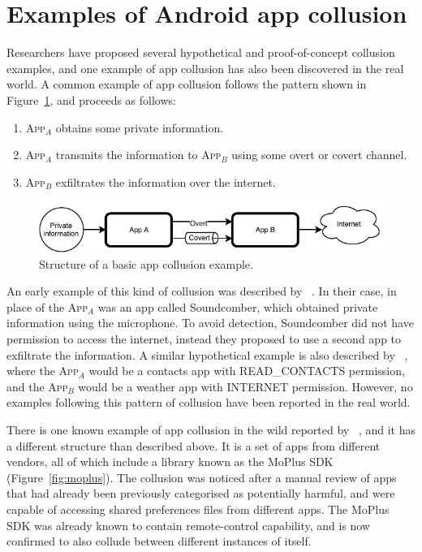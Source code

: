 \documentclass[article, oneside]{aaltoseries}
\newcommand{\Fref}[1]{Figure~\ref{#1}}
\newcommand{\app}[1]{A\textsc{pp}$_{#1}$\xspace}
\begin{document}
\section{Examples of Android app collusion}
\label{sec:examples}

Researchers have proposed several hypothetical and proof-of-concept collusion examples, and one example of app collusion has also been discovered in the real world. A common example of app collusion follows the pattern shown in \Fref{fig:sample}, and proceeds as follows:
\begin{enumerate}[nosep]
	\item \app{A} obtains some private information.
	\item \app{A} transmits the information to \app{B} using some overt or covert channel.
	\item \app{B} exfiltrates the information over the internet.
\end{enumerate}

\begin{figure}[h]
	\centering
	\includegraphics[width=1.0\textwidth]{figures/Collusion1}
	\caption{Structure of a basic app collusion example.}
	\label{fig:sample}
\end{figure}

An early example of this kind of collusion was described by \citeauthor{Schlegel2011}~\cite{Schlegel2011}. In their case, in place of the \app{A} was an app called Soundcomber, which obtained private information using the microphone. To avoid detection, Soundcomber did not have permission to access the internet, instead they proposed to use a second app to exfiltrate the information. A similar hypothetical example is also described by \citeauthor{Asavoae2017}~\cite{Asavoae2017}, where the \app{A} would be a contacts app with READ\_CONTACTS permission, and the \app{B} would be a weather app with INTERNET permission. However, no examples following this pattern of collusion have been reported in the real world.

There is one known example of app collusion in the wild reported by \citeauthor{Blasco2016}~\cite{Blasco2016}, and it has a different structure than described above. It is a set of apps from different vendors, all of which include a library known as the MoPlus SDK (\Fref{fig:moplus}). The collusion was noticed after a manual review of apps that had already been previously categorised as potentially harmful, and were capable of accessing shared preferences files from different apps. The MoPlus SDK was already known to contain remote-control capability, and is now confirmed to also collude between different instances of itself.
\end{document}
